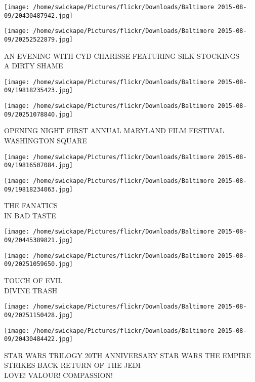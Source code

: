 \documentclass[10pt,letterpaper]{article}
\begin{document}
\texttt{[image: /home/swickape/Pictures/flickr/Downloads/Baltimore 2015-08-09/20430487942.jpg]}

\vspace{0.25in}
\texttt{[image: /home/swickape/Pictures/flickr/Downloads/Baltimore 2015-08-09/20252522879.jpg]}

AN EVENING WITH CYD CHARISSE FEATURING SILK STOCKINGS\\
A DIRTY SHAME\\
\pagebreak

\texttt{[image: /home/swickape/Pictures/flickr/Downloads/Baltimore 2015-08-09/19818235423.jpg]}

\vspace{0.25in}
\texttt{[image: /home/swickape/Pictures/flickr/Downloads/Baltimore 2015-08-09/20251078840.jpg]}

OPENING NIGHT FIRST ANNUAL MARYLAND FILM FESTIVAL\\
WASHINGTON SQUARE\\
\pagebreak

\texttt{[image: /home/swickape/Pictures/flickr/Downloads/Baltimore 2015-08-09/19816507084.jpg]}

\vspace{0.25in}
\texttt{[image: /home/swickape/Pictures/flickr/Downloads/Baltimore 2015-08-09/19818234063.jpg]}

THE FANATICS\\
IN BAD TASTE\\
\pagebreak

\texttt{[image: /home/swickape/Pictures/flickr/Downloads/Baltimore 2015-08-09/20445389821.jpg]}

\vspace{0.25in}
\texttt{[image: /home/swickape/Pictures/flickr/Downloads/Baltimore 2015-08-09/20251059650.jpg]}

TOUCH OF EVIL\\
DIVINE TRASH\\
\pagebreak

\texttt{[image: /home/swickape/Pictures/flickr/Downloads/Baltimore 2015-08-09/20251150428.jpg]}

\vspace{0.25in}
\texttt{[image: /home/swickape/Pictures/flickr/Downloads/Baltimore 2015-08-09/20430484422.jpg]}

STAR WARS TRILOGY 20TH ANNIVERSARY STAR WARS THE EMPIRE STRIKES BACK RETURN OF THE JEDI\\
LOVE!  VALOUR!  COMPASSION!\\
\pagebreak
\end{document}
